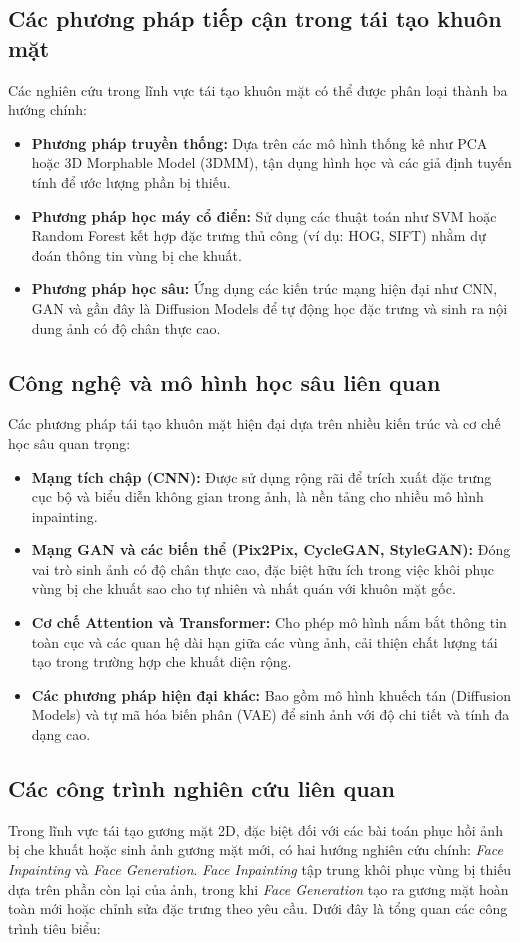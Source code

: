 \documentclass[12pt,a4paper]{article}
\begin{document}
	\subsection{Các phương pháp tiếp cận trong tái tạo khuôn mặt}
	Các nghiên cứu trong lĩnh vực tái tạo khuôn mặt có thể được phân loại thành ba hướng chính:
	\begin{itemize}
		\item \textbf{Phương pháp truyền thống:} Dựa trên các mô hình thống kê như PCA hoặc 3D Morphable Model (3DMM), tận dụng hình học và các giả định tuyến tính để ước lượng phần bị thiếu.
		\item \textbf{Phương pháp học máy cổ điển:} Sử dụng các thuật toán như SVM hoặc Random Forest kết hợp đặc trưng thủ công (ví dụ: HOG, SIFT) nhằm dự đoán thông tin vùng bị che khuất.
		\item \textbf{Phương pháp học sâu:} Ứng dụng các kiến trúc mạng hiện đại như CNN, GAN và gần đây là Diffusion Models để tự động học đặc trưng và sinh ra nội dung ảnh có độ chân thực cao.
	\end{itemize}
	
	\subsection{Công nghệ và mô hình học sâu liên quan}
	Các phương pháp tái tạo khuôn mặt hiện đại dựa trên nhiều kiến trúc và cơ chế học sâu quan trọng:
	\begin{itemize}
		\item \textbf{Mạng tích chập (CNN):} Được sử dụng rộng rãi để trích xuất đặc trưng cục bộ và biểu diễn không gian trong ảnh, là nền tảng cho nhiều mô hình inpainting.
		\item \textbf{Mạng GAN và các biến thể (Pix2Pix, CycleGAN, StyleGAN):} Đóng vai trò sinh ảnh có độ chân thực cao, đặc biệt hữu ích trong việc khôi phục vùng bị che khuất sao cho tự nhiên và nhất quán với khuôn mặt gốc.
		\item \textbf{Cơ chế Attention và Transformer:} Cho phép mô hình nắm bắt thông tin toàn cục và các quan hệ dài hạn giữa các vùng ảnh, cải thiện chất lượng tái tạo trong trường hợp che khuất diện rộng.
		\item \textbf{Các phương pháp hiện đại khác:} Bao gồm mô hình khuếch tán (Diffusion Models) và tự mã hóa biến phân (VAE) để sinh ảnh với độ chi tiết và tính đa dạng cao.
	\end{itemize}
	\subsection{Các công trình nghiên cứu liên quan}
	Trong lĩnh vực tái tạo gương mặt 2D, đặc biệt đối với các bài toán phục hồi ảnh bị che khuất hoặc sinh ảnh gương mặt mới, có hai hướng nghiên cứu chính: \textit{Face Inpainting} và \textit{Face Generation}. \textit{Face Inpainting} tập trung khôi phục vùng bị thiếu dựa trên phần còn lại của ảnh, trong khi \textit{Face Generation} tạo ra gương mặt hoàn toàn mới hoặc chỉnh sửa đặc trưng theo yêu cầu. Dưới đây là tổng quan các công trình tiêu biểu:
	
\end{document}
